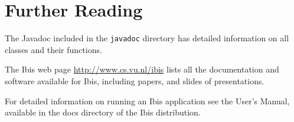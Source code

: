\documentclass[10pt]{article}
\begin{document}
\section{Further Reading}

The Javadoc included in the \texttt{javadoc} directory has detailed
information on all classes and their functions.

The Ibis web page \url{http://www.cs.vu.nl/ibis} lists all
the documentation and software available for Ibis, including papers, and
slides of presentations.

For detailed information on running an Ibis application see the
User's Manual, available in the docs directory of the Ibis
distribution.
\end{document}
